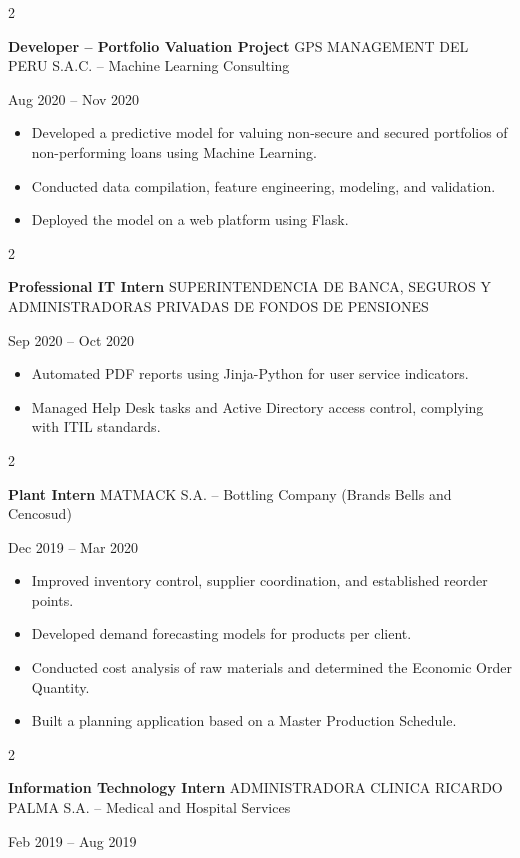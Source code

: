 \documentclass[10pt, letterpaper]{article}
\newenvironment{highlights}{
    \begin{itemize}[
        topsep=0.10 cm,
        parsep=0.10 cm,
        partopsep=0pt,
        itemsep=0pt,
        leftmargin=0 cm + 10pt
    ]
}{
    \end{itemize}
} %
\newenvironment{twocolentry}[2][]{
    \onecolentry
    \def\secondColumn{#2}
    \setcolumnwidth{\fill, 4.5 cm}
    \begin{paracol}{2}
}{
    \switchcolumn \raggedleft \secondColumn
    \end{paracol}
    \endonecolentry
} %
\begin{document}
\begin{twocolentry}{Aug 2020 – Nov 2020}
    \textbf{Developer – Portfolio Valuation Project} \textbar GPS MANAGEMENT DEL PERU S.A.C. – Machine Learning Consulting
\end{twocolentry}
\begin{highlights}
    \item Developed a predictive model for valuing non-secure and secured portfolios of non-performing loans using Machine Learning.
    \item Conducted data compilation, feature engineering, modeling, and validation.
    \item Deployed the model on a web platform using Flask.
\end{highlights}
\vspace{0.3cm}
\begin{twocolentry}{Sep 2020 – Oct 2020}
    \textbf{Professional IT Intern} \textbar SUPERINTENDENCIA DE BANCA, SEGUROS Y ADMINISTRADORAS PRIVADAS DE FONDOS DE PENSIONES
\end{twocolentry}
\begin{highlights}
    \item Automated PDF reports using Jinja-Python for user service indicators.
    \item Managed Help Desk tasks and Active Directory access control, complying with ITIL standards.
\end{highlights}
\vspace{0.3cm}
\begin{twocolentry}{Dec 2019 – Mar 2020}
    \textbf{Plant Intern} \textbar MATMACK S.A. – Bottling Company (Brands Bells and Cencosud)
\end{twocolentry}
\begin{highlights}
    \item Improved inventory control, supplier coordination, and established reorder points.
    \item Developed demand forecasting models for products per client.
    \item Conducted cost analysis of raw materials and determined the Economic Order Quantity.
    \item Built a planning application based on a Master Production Schedule.
\end{highlights}
\vspace{0.3cm}
\begin{twocolentry}{Feb 2019 – Aug 2019}
    \textbf{Information Technology Intern} \textbar ADMINISTRADORA CLINICA RICARDO PALMA S.A. – Medical and Hospital Services
\end{twocolentry}
\end{document}
